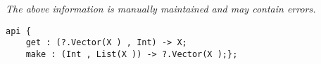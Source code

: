 \label{api:Unsafe\_Vector}

{\tiny \it The above information is manually maintained and may contain errors.}
\begin{verbatim}
api {
    get : (?.Vector(X ) , Int) -> X;
    make : (Int , List(X )) -> ?.Vector(X );};
\end{verbatim}
